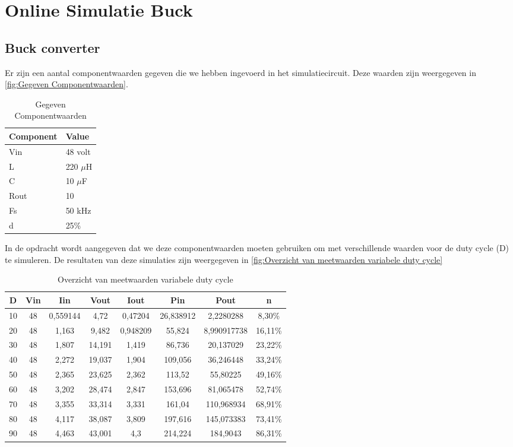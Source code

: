 \section{Online Simulatie Buck}
\subsection{Buck converter}
Er zijn een aantal componentwaarden gegeven die we hebben ingevoerd in het simulatiecircuit. Deze waarden zijn weergegeven in \autoref{fig:Gegeven Componentwaarden}.
\begin{table}[h!]
\centering
\begin{tabular}{|l|l|}
\hline
\textbf{Component} & \textbf{Value} \\
\hline
Vin & 48 volt \\
L   & 220 $\mu$H \\
C   & 10 $\mu$F \\
Rout & 10 \\
Fs  & 50 kHz \\
d   & 25\% \\
\hline
\end{tabular}
\caption{Gegeven Componentwaarden}\label{fig:Gegeven Componentwaarden}
\end{table}
In de opdracht wordt aangegeven dat we deze componentwaarden moeten gebruiken om met verschillende waarden voor de duty cycle (D) te simuleren. De resultaten van deze simulaties zijn weergegeven in \autoref{fig:Overzicht van meetwaarden variabele duty cycle}
\begin{table}[h!]
\centering
\begin{tabular}{|c|c|c|c|c|c|c|c|}
\hline
\textbf{D} & \textbf{Vin} & \textbf{Iin} & \textbf{Vout} & \textbf{Iout} & \textbf{Pin} & \textbf{Pout} & \textbf{n} \\
\hline
10 & 48 & 0,559144 & 4,72 & 0,47204 & 26,838912 & 2,2280288 & 8,30\% \\
20 & 48 & 1,163 & 9,482 & 0,948209 & 55,824 & 8,990917738 & 16,11\% \\
30 & 48 & 1,807 & 14,191 & 1,419 & 86,736 & 20,137029 & 23,22\% \\
40 & 48 & 2,272 & 19,037 & 1,904 & 109,056 & 36,246448 & 33,24\% \\
50 & 48 & 2,365 & 23,625 & 2,362 & 113,52 & 55,80225 & 49,16\% \\
60 & 48 & 3,202 & 28,474 & 2,847 & 153,696 & 81,065478 & 52,74\% \\
70 & 48 & 3,355 & 33,314 & 3,331 & 161,04 & 110,968934 & 68,91\% \\
80 & 48 & 4,117 & 38,087 & 3,809 & 197,616 & 145,073383 & 73,41\% \\
90 & 48 & 4,463 & 43,001 & 4,3 & 214,224 & 184,9043 & 86,31\% \\
\hline
\end{tabular}
\caption{Overzicht van meetwaarden variabele duty cycle}\label{fig:Overzicht van meetwaarden variabele duty cycle}
\end{table}
